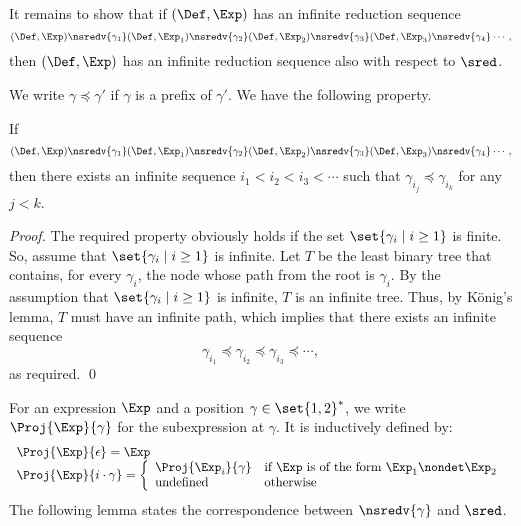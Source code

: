 It remains to show that
if \((\Def,\Exp)\) has an infinite reduction sequence
\[(\Def,\Exp)\nsredv{\gamma_1} (\Def,\Exp_1)\nsredv{\gamma_2}
(\Def,\Exp_2)\nsredv{\gamma_3}(\Def,\Exp_3)\nsredv{\gamma_4}\cdots,\]
then
\((\Def,\Exp)\) has an infinite reduction sequence also with respect to \(\sred\).

We write \(\gamma \preceq \gamma'\) if \(\gamma\) is a prefix of \(\gamma'\).
We have the following property.
\begin{lemma}
  \label{lem:inf-nsredv}
  If
\[(\Def,\Exp)\nsredv{\gamma_1} (\Def,\Exp_1)\nsredv{\gamma_2}
(\Def,\Exp_2)\nsredv{\gamma_3}(\Def,\Exp_3)\nsredv{\gamma_4}\cdots,\]
then there exists an infinite sequence
\(i_1 < i_2 < i_3< \cdots\)
such that \(\gamma_{i_j} \preceq \gamma_{i_k}\) for any \(j<k\).
\end{lemma}
\begin{proof}
  The required property obviously holds if   the set \(\set{\gamma_i\mid i\ge 1}\) is finite.
  So, assume that \(\set{\gamma_i\mid i\ge 1}\) is infinite.
  Let \(T\) be the least binary tree that contains, for every \(\gamma_i\),
  the node whose path from the root is \(\gamma_i\).
  By the assumption that \(\set{\gamma_i\mid i\ge 1}\) is infinite,
  \(T\) is an infinite tree. Thus, by K\"onig's lemma,
  \(T\) must have an infinite path, which implies that
  there exists an infinite sequence
  \[\gamma_{i_1} \preceq \gamma_{i_2} \preceq \gamma_{i_3} \preceq \cdots, \]
  as required. \qed
\end{proof}


For an expression \(\Exp\) and a position \(\gamma\in\set{1,2}^*\), we write
\(\Proj{\Exp}{\gamma}\) for the subexpression at \(\gamma\). It is inductively defined by:
\[
\begin{array}{l}
\Proj{\Exp}{\epsilon} = \Exp\\
\Proj{\Exp}{i\cdot \gamma} =
\left\{\begin{array}{ll}
  \Proj{\Exp_i}{\gamma} & \mbox{if $\Exp$ is of the form \(\Exp_1\nondet \Exp_2\)}\\
  \mbox{undefined}\hspace*{2em} & \mbox{otherwise}
\end{array}\right.
\end{array}
\]
The following lemma states the correspondence between \(\nsredv{\gamma}\) and \(\sred\).

